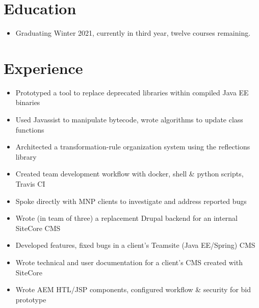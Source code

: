 \documentclass[]{rcf_cv}
\begin{document}
	
	
	
	\section{Education}
	
		\begin{itemize}
			\setlength\itemsep{-0.4em}
			\renewcommand\labelitemi{--}
			
			\item Graduating Winter 2021, currently in third year, twelve courses remaining.	
					
			
			
		\end{itemize}
	
	\section{Experience}
	
		\begin{itemize}
			\setlength\itemsep{-0.4em}
			\renewcommand\labelitemi{--}
			
			\item Prototyped a tool to replace deprecated libraries within compiled Java EE binaries
			\item Used Javassist to manipulate bytecode, wrote algorithms to update class functions
			\item Architected a transformation-rule organization system using the reflections library
			\item Created team development workflow with docker, shell \& python scripts, Travis CI

		\end{itemize}
	
		\begin{itemize}
			\setlength\itemsep{-0.4em}
			\renewcommand\labelitemi{--}
			
			\item Spoke directly with MNP clients to investigate and address reported bugs
			\item Wrote (in team of three) a replacement Drupal backend for an internal SiteCore CMS
			\item Developed features, fixed bugs in a client's Teamsite (Java EE/Spring) CMS
			\item Wrote technical and user documentation for a client's CMS created with SiteCore 
			\item Wrote AEM HTL/JSP components, configured workflow \& security for bid prototype

			
		\end{itemize}
	
\end{document}
